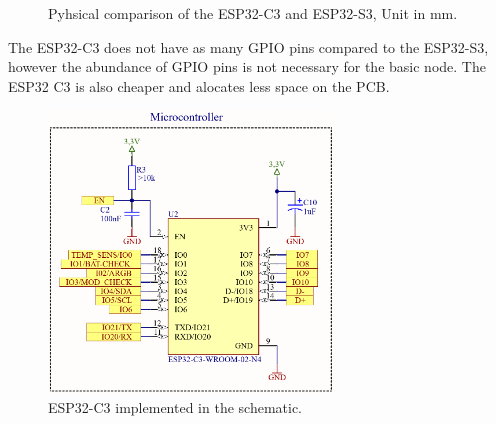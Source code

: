         \begin{figure}[H]%
            \centering
            \qquad
            \caption{Pyhsical comparison of the ESP32-C3 and ESP32-S3, Unit in mm.}%
            \label{fig:example}%
        \end{figure}

        The ESP32-C3 does not have as many GPIO pins compared to the ESP32-S3, however the 
        abundance of GPIO pins is not necessary for the basic node. The ESP32 C3 is also 
        cheaper and alocates less space on the PCB.

        \begin{figure}[H]
            \centering
            \includegraphics[height = 7.5cm]{assets/HW/ESP32-C3-schematic.png}
            \caption{ESP32-C3 implemented in the schematic.}
        \end{figure}




